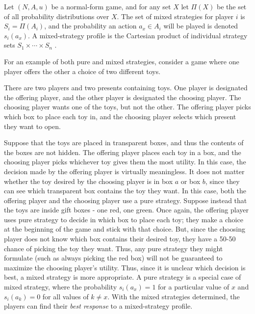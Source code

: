 \begin{define}
  Let $(N,A,u)$ be a normal-form game, and for any set $X$ let $\Pi(X)$ be the set of all probability distributions over $X$. The set of mixed strategies for player $i$ is $S_i = \Pi(A_i)$, and the probability an action $a_x\in A_i$ will be played is denoted $s_i(a_x)$. A mixed-strategy profile is the Cartesian product of individual strategy sets $S_1\times\cdots\times S_n$ \cite{shoh09}.
\end{define}

For an example of both pure and mixed strategies, consider a game where one player offers the other a choice of two different toys.

\begin{exmp}
  There are two players and two presents containing toys. One player is designated the offering player, and the other player is designated the choosing player. The choosing player wants one of the toys, but not the other. The offering player picks which box to place each toy in, and the choosing player selects which present they want to open.
\end{exmp}

Suppose that the toys are placed in transparent boxes, and thus the contents of the boxes are not hidden. The offering player places each toy in a box, and the choosing player picks whichever toy gives them the most utility. In this case, the decision made by the offering player is virtually meaningless. It does not matter whether the toy desired by the choosing player is in box $a$ or box $b$, since they can see which transparent box contains the toy they want. In this case, both the offering player and the choosing player use a pure strategy. Suppose instead that the toys are inside gift boxes - one red, one green. Once again, the offering player uses pure strategy to decide in which box to place each toy; they make a choice at the beginning of the game and stick with that choice. But, since the choosing player does not know which box contains their desired toy, they have a 50-50 chance of picking the toy they want. Thus, any pure strategy they might formulate (such as always picking the red box) will not be guaranteed to maximize the choosing player's utility. Thus, since it is unclear which decision is best, a mixed strategy is more appropriate. A pure strategy is a special case of mixed strategy, where the probability $s_i(a_x)=1$ for a particular value of $x$ and $s_i(a_k)=0$ for all values of $k\neq x$. With the mixed strategies determined, the players can find their \textit{best response} to a mixed-strategy profile.

